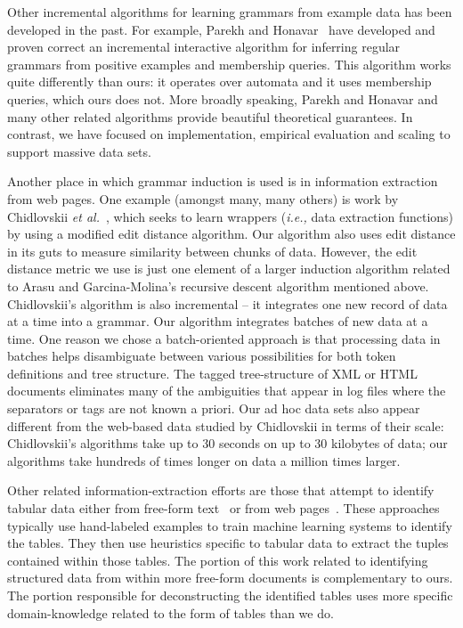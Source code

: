 Other incremental algorithms for learning grammars from example data
has been developed in the past.  For example, Parekh and 
Honavar~\cite{parekh+:incremental} have developed and proven correct
an incremental interactive algorithm for inferring
regular grammars from positive examples and membership queries.
This algorithm works quite differently than ours:  it operates over
automata and it uses membership queries, which ours does not.
More broadly speaking, Parekh and Honavar and many other related algorithms
provide beautiful theoretical guarantees.  In contrast, we have
focused on implementation, empirical 
evaluation and scaling to support massive data sets.

Another place in which grammar induction is used is in information
extraction from web pages.  One example (amongst many, many others) is
work by Chidlovskii {\em et al.}~\cite{chidlovskii+:wrapper-generation},
which seeks to learn wrappers ({\em i.e.,} data extraction functions)
by using a modified edit distance algorithm.  Our algorithm also
uses edit distance in its guts to measure similarity
between chunks of data.  However, the edit distance metric we use is just
one element of a larger induction algorithm related to Arasu and
Garcina-Molina's recursive descent algorithm mentioned above.
Chidlovskii's algorithm is also incremental -- it
integrates one new record of data at a time into a grammar.
Our algorithm integrates batches of new data at a time.  One
reason we chose a batch-oriented approach is that processing
data in batches helps
disambiguate between various possibilities for both token
definitions and tree structure.  The tagged tree-structure of
XML or HTML documents eliminates many of the ambiguities that
appear in log files where the separators or tags are not known
a priori.  Our ad hoc data sets also appear different
from the web-based data studied by Chidlovskii in terms of their
scale:  Chidlovskii's algorithms take up to
30 seconds on up to 30 kilobytes of data; our algorithms 
take hundreds of times longer on data a million times larger.

Other related information-extraction efforts
are those that attempt to identify tabular data 
either from free-form text~\cite{Ng+:texttables,Pinto+:texttables} or
from web pages~\cite{Lerman+:webtables}.  These approaches typically
use hand-labeled examples to train machine learning systems to
identify the tables.  They then use heuristics specific to tabular
data to extract the tuples contained within those tables.  The portion
of this work related to identifying structured data from within more
free-form documents is complementary to ours.  The portion responsible
for deconstructing the identified tables uses more specific
domain-knowledge related to the form of tables than we do.

